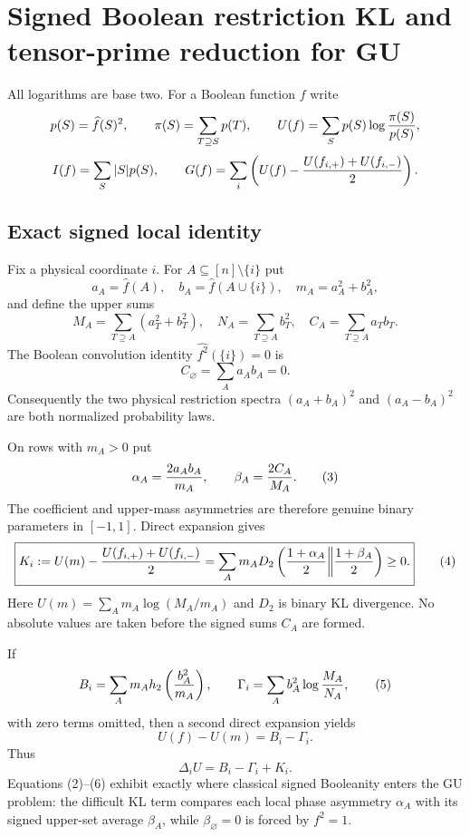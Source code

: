 \section*{Signed Boolean restriction KL and tensor-prime reduction for GU}

All logarithms are base two.  For a Boolean function $f$ write
\[
 p(S)=\widehat f(S)^2,
 \qquad \pi(S)=\sum_{T\supseteq S}p(T),
 \qquad U(f)=\sum_Sp(S)\log{\pi(S)\over p(S)},
\]
\[
 I(f)=\sum_S|S|p(S),
 \qquad
 G(f)=\sum_i\left(U(f)-{U(f_{i,+})+U(f_{i,-})\over2}\right).
\]

\subsection*{Exact signed local identity}

Fix a physical coordinate $i$.  For $A\subseteq[n]\setminus\{i\}$ put
\[
 a_A=\widehat f(A),\quad b_A=\widehat f(A\cup\{i\}),\quad
 m_A=a_A^2+b_A^2,
\]
and define the upper sums
\[
 M_A=\sum_{T\supseteq A}(a_T^2+b_T^2),\quad
 N_A=\sum_{T\supseteq A}b_T^2,\quad
 C_A=\sum_{T\supseteq A}a_Tb_T.                     \tag{1}
\]
The Boolean convolution identity $\widehat{f^2}(\{i\})=0$ is
\[
 \boxed{C_\varnothing=\sum_Aa_Ab_A=0.}              \tag{2}
\]
Consequently the two physical restriction spectra
$(a_A+b_A)^2$ and $(a_A-b_A)^2$ are both normalized probability laws.

On rows with $m_A>0$ put
\[
 \alpha_A={2a_Ab_A\over m_A},\qquad
 \beta_A={2C_A\over M_A}.                            \tag{3}
\]
The coefficient and upper-mass asymmetries are therefore genuine binary
parameters in $[-1,1]$.  Direct expansion gives
\[
 \boxed{
 K_i:=U(m)-{U(f_{i,+})+U(f_{i,-})\over2}
 =\sum_A m_A D_2\left({1+\alpha_A\over2}\middle\|
                       {1+\beta_A\over2}\right)\ge0.} \tag{4}
\]
Here $U(m)=\sum_Am_A\log(M_A/m_A)$ and $D_2$ is binary KL divergence.
No absolute values are taken before the signed sums $C_A$ are formed.

If
\[
 B_i=\sum_A m_A h_2\left({b_A^2\over m_A}\right),
 \qquad
 \Gamma_i=\sum_A b_A^2\log{M_A\over N_A},            \tag{5}
\]
with zero terms omitted, then a second direct expansion yields
\[
 U(f)-U(m)=B_i-\Gamma_i.
\]
Thus
\[
 \boxed{\Delta_iU=B_i-\Gamma_i+K_i.}                 \tag{6}
\]
Equations (2)--(6) exhibit exactly where classical signed Booleanity enters
the GU problem: the difficult KL term compares each local phase
asymmetry $\alpha_A$ with its signed upper-set average $\beta_A$, while
$\beta_\varnothing=0$ is forced by $f^2=1$.


